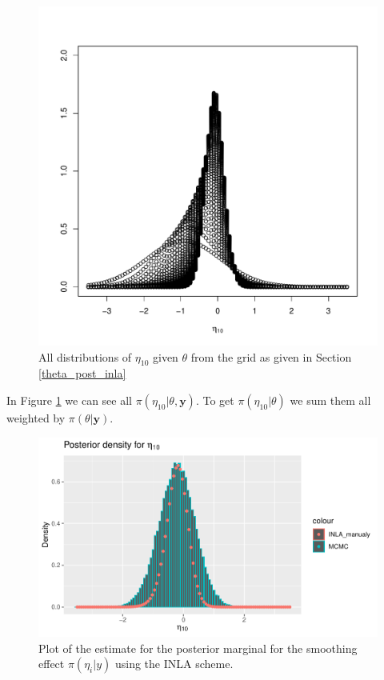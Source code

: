 \begin{figure}
    \centering
    \includegraphics[width=\textwidth]{Images/eta_10.pdf}
    \caption{All distributions of $\eta_{10}$ given $\theta$ from the grid as given in Section \ref{theta_post_inla}}
    \label{fig:eta_all}
\end{figure}


In Figure \ref{fig:eta_all} we can see all $\pi(\eta_{10}|\theta, \boldsymbol{y})$. To get  $\pi(\eta_{10}|\theta)$ we sum them all weighted by $\pi(\theta|\boldsymbol{y})$. 

\begin{figure}[h!]
    \centering
    \includegraphics[width=\textwidth]{Images/post_eta_inla.pdf}
    \caption{Plot of the estimate for the posterior marginal for the smoothing effect $\pi(\eta_i|y)$ using the INLA scheme.}
    \label{fig:post_eta_inla}
\end{figure}

